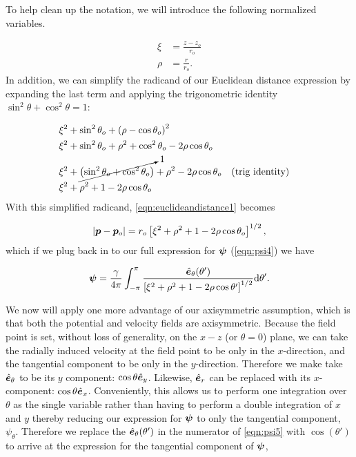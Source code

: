 To help clean up the notation, we will introduce the following normalized variables.

\begin{align}
    \xi &= \frac{z - z_o}{r_o} \\
    \rho &= \frac{r}{r_o}.
\end{align}
%
In addition, we can simplify the radicand of our Euclidean distance expression by expanding the last term and applying the trigonometric identity \(\sin^2\theta + \cos^2\theta =1\):

\begin{equation}
    \begin{aligned}
        \xi^2  &+ \sin^2\theta_o + \left(\rho-\cos\theta_o\right)^2 \\
        \xi^2  &+ \sin^2\theta_o + \rho^2+\cos^2\theta_o-2\rho\cos\theta_o \\
        \xi^2  &+ \cancelto{1}{\left(\sin^2\theta_o + \cos^2\theta_o\right)} + \rho^2-2\rho\cos\theta_o && (\text{trig identity}) \\
        \xi^2  &+ \rho^2 + 1 -2\rho\cos\theta_o \\
    \end{aligned}
\end{equation}
%
With this simplified radicand, \cref{eqn:euclideandistance1} becomes

\begin{equation}
    \label{eqn:euclideandistance2}
    |\bm{p}-\bm{p}_o| = r_o \left[ \xi^2  + \rho^2 + 1 -2\rho\cos\theta_o \right]^{1/2},
\end{equation}
%
which if we plug back in to our full expression for \(\bm{\psi}\) (\cref{eqn:psi4}) we have

\begin{equation}
    \label{eqn:psi5}
    \bm{\psi} = \frac{\gamma}{4\pi} \int_{-\pi}^{\pi} \frac{ \hat{\bm{e}}_\theta(\theta')}{\left[ \xi^2  + \rho^2 + 1 -2\rho\cos\theta' \right]^{1/2}} \mathrm{d}\theta'.
\end{equation}

We now will apply one more advantage of our axisymmetric assumption, which is that both the potential and velocity fields are axisymmetric.
%
Because the field point is set, without loss of generality, on the \(x-z\) (or \(\theta=0\)) plane, we can take the radially induced velocity at the field point to be only in the \(x\)-direction, and the tangential component to be only in the \(y\)-direction.
%
Therefore we make take \(\hat{\bm{e}}_\theta\) to be its \(y\) component: \(\cos\theta\hat{\bm{e}}_y\).
%
Likewise, \(\hat{\bm{e}}_r\) can be replaced with its \(x\)-component: \(\cos\theta\hat{\bm{e}}_x\).
%
Conveniently, this allows us to perform one integration over \(\theta\) as the single variable rather than having to perform a double integration of \(x\) and \(y\) thereby reducing our expression for \(\bm{\psi}\) to only the tangential component, \(\psi_\theta\).
%
Therefore we replace the \(\hat{\bm{e}}_\theta(\theta')\) in the numerator of \cref{eqn:psi5} with \(\cos(\theta')\) to arrive at the expression for the tangential component of \(\bm{\psi}\),

